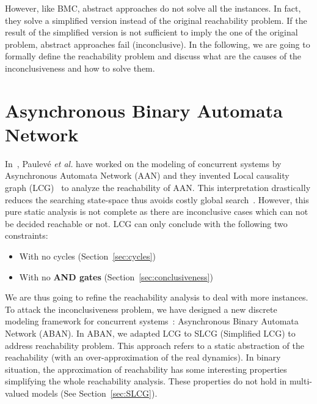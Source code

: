 However, like BMC, abstract approaches do not solve all the instances.
In fact, they solve a simplified version instead of the original reachability problem.
If the result of the simplified version is not sufficient to imply the one of the original problem, abstract approaches fail (inconclusive).
In the following, we are going to formally define the reachability problem and discuss what are the causes of the inconclusiveness and how to solve them. 

\section{Asynchronous Binary Automata Network}
In~\cite{folschette2015}, Paulev\'e \textit{et al.} have worked on the modeling of concurrent systems by Asynchronous Automata Network (AAN) and they invented Local causality graph (LCG)~\cite{pauleve2017reduction,folschette2015,pauleve2011} to analyze the reachability of AAN.
This interpretation drastically reduces the searching state-space thus avoids costly global search~\cite{pauleve2012}. 
However, this pure static analysis is not complete as there are inconclusive cases which can not be decided reachable or not.
LCG can only conclude with the following two constraints:

\begin{itemize}
    \item With no cycles (Section~\ref{sec:cycles})
    \item With no \textbf{AND gates} (Section~\ref{sec:conclusiveness})
\end{itemize}

We are thus going to refine the reachability analysis to deal with more instances.
To attack the inconclusiveness problem, we have designed a new discrete modeling framework for concurrent systems~\cite{chai2018heuristic}: Asynchronous Binary Automata Network (ABAN).
In ABAN, we adapted LCG to SLCG (Simplified LCG) to address reachability problem.
This approach refers to a static abstraction of the reachability (with an over-approximation of the real dynamics).
In binary situation, the approximation of reachability has some interesting properties simplifying the whole reachability analysis.
These properties do not hold in multi-valued models (See Section~\ref{sec:SLCG}).

